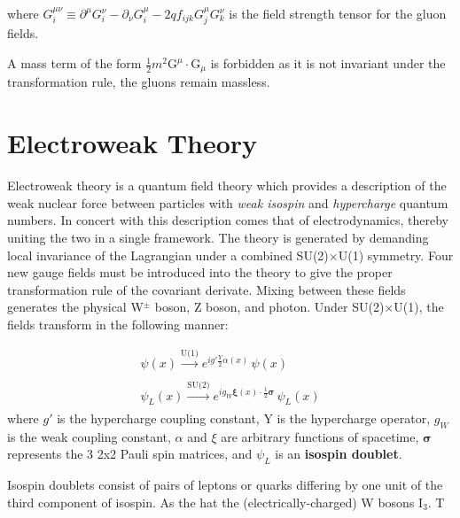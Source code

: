 where $G^{\mu\nu}_{i} \equiv \partial^{\mu} G^{\nu}_{i} - \partial_{\nu} G^{\mu}_{i} - 2 q f_{ijk} G^{\mu}_{j} G^{\nu}_{k}$ is the field strength tensor for the gluon fields.

A mass term of the form $\frac{1}{2}m^{2}\bm{\mathrm{G}}^{\mu} \cdot \bm{\mathrm{G}}_{\mu}$ is forbidden as it is not invariant under the transformation rule, the gluons remain massless.

\section{Electroweak Theory}

Electroweak theory is a quantum field theory which provides a description of the weak nuclear force between particles with \textit{weak isospin} and \textit{hypercharge} quantum numbers. In concert with this description comes that of electrodynamics, thereby uniting the two in a single framework. The theory is generated by demanding local invariance of the Lagrangian under a combined SU(2)$\times$U(1) symmetry. Four new gauge fields must be introduced into the theory to give the proper transformation rule of the covariant derivate. Mixing between these fields generates the physical W$^{\pm}$ boson, Z boson, and photon. Under SU(2)$\times$U(1), the fields transform in the following manner:

\begin{equation}
\begin{array}{l}
\psi(x) \xrightarrow[]{\text{U(1)}} e^{i g' \frac{Y}{2} \alpha(x)} \, \psi(x) \\
\psi_{L}(x) \xrightarrow[]{\text{SU(2)}} e^{i g_{W} \bm{\xi}(x) \cdot \frac{1}{2} \bm{\sigma} } \, \psi_{L}(x) 
\end{array}
\end{equation}
where $g'$ is the hypercharge coupling constant, Y is the hypercharge operator, $g_{W}$ is the weak coupling constant, $\alpha$ and $\xi$ are arbitrary functions of spacetime, $\bm{\sigma}$ represents the 3 2x2 Pauli spin matrices, and $\psi_{L}$ is an \textbf{isospin doublet}.

Isospin doublets consist of pairs of leptons or quarks differing by one unit of the third component of isospin. As the hat the (electrically-charged) W bosons I$_{3}$. T

